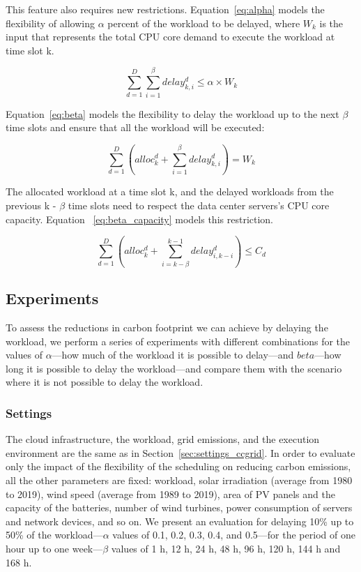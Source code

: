 This feature also requires new restrictions. Equation~\eqref{eq:alpha} models the flexibility of allowing $\alpha$ percent of the workload to be delayed, where $W_k$ is the input that represents the total CPU core demand to execute the workload at time slot k.


\begin{equation} \label{eq:alpha}
   \sum_{d=1}^D  \sum_{i=1}^{\beta} delay_{k,i}^d \leq  \alpha   \times W_k
\end{equation}


Equation~\eqref{eq:beta} models the flexibility to delay the workload up to the next $\beta$ time slots and ensure that all the workload will be executed:


\begin{equation} \label{eq:beta}
  \sum_{d=1}^D    (alloc_k^d +    \sum_{i=1}^{\beta} delay_{k,i}^d) = W_k  
\end{equation}


The allocated workload at a time slot k, and the delayed workloads from the previous k - $\beta$ time slots need to respect the data center servers's CPU core capacity. Equation ~\eqref{eq:beta_capacity} models this restriction.
     
\begin{equation} \label{eq:beta_capacity}
\sum_{d=1}^D    (alloc_k^d  +    \sum_{i=k-\beta}^{k-1} delay_{  i ,  k-i  }^d)  \leq C_d 
\end{equation}

\subsection{Experiments}

To assess the reductions in carbon footprint we can achieve by delaying the workload, we perform a series of experiments with different combinations for the values of $\alpha$---how much of the workload it is possible to delay---and $beta$---how long it is possible to delay the workload---and compare them with the scenario where it is not possible to delay the workload.

\subsubsection{Settings}

The cloud infrastructure, the workload, grid emissions, and the execution environment are the same as in Section~\ref{sec:settings_ccgrid}. In order to evaluate only the impact of the flexibility of the scheduling on reducing carbon emissions, all the other parameters are fixed: workload, solar irradiation (average from 1980 to 2019), wind speed (average from 1989 to 2019), area of PV panels and the capacity of the batteries, number of wind turbines, power consumption of servers and network devices, and so on. We present an evaluation for delaying 10\% up to 50\% of the workload---$\alpha$ values of 0.1, 0.2, 0.3, 0.4, and 0.5---for the period of one hour up to one week---$\beta$ values of 1 h, 12 h, 24 h, 48 h, 96 h, 120 h, 144 h and 168 h.

